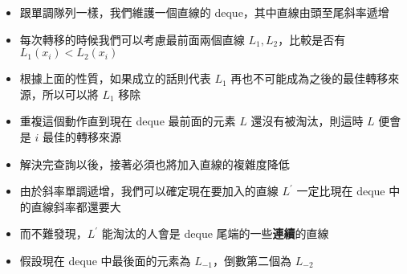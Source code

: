\documentclass[standalone]{beamer}
\begin{document}
\begin{frame}{}
  \begin{itemize}
    \item 跟單調隊列一樣，我們維護一個直線的 deque，其中直線由頭至尾斜率遞增
    \item 每次轉移的時候我們可以考慮最前面兩個直線 $L_1, L_2$，比較是否有 $L_1(x_i) < L_2(x_i)$
    \item 根據上面的性質，如果成立的話則代表 $L_1$ 再也不可能成為之後的最佳轉移來源，所以可以將 $L_1$ 移除
    \item 重複這個動作直到現在 deque 最前面的元素 $L$ 還沒有被淘汰，則這時 $L$ 便會是 $i$ 最佳的轉移來源
  \end{itemize}
\end{frame}

\begin{frame}{}
  \begin{itemize}
    \item 解決完查詢以後，接著必須也將加入直線的複雜度降低
    \item 由於斜率單調遞增，我們可以確定現在要加入的直線 $L^\prime$ 一定比現在 deque 中的直線斜率都還要大
    \item 而不難發現，$L^\prime$ 能淘汰的人會是 deque 尾端的一些\textbf{連續}的直線
    \item 假設現在 deque 中最後面的元素為 $L_{-1}$，倒數第二個為 $L_{-2}$
  \end{itemize}
\end{frame}
\end{document}
